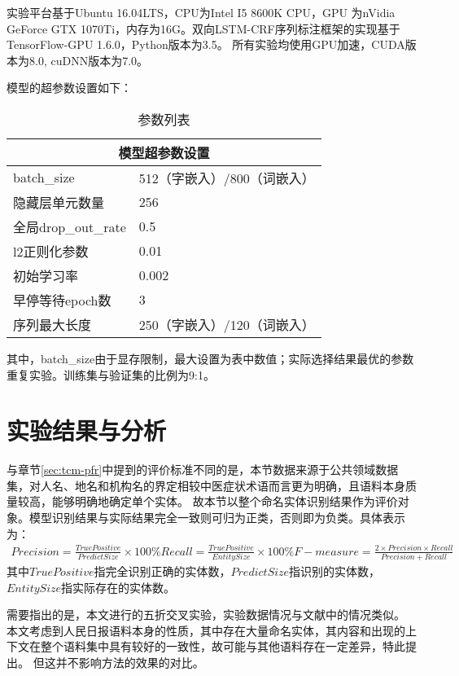 实验平台基于Ubuntu 16.04LTS，CPU为Intel I5 8600K CPU，GPU 为nVidia GeForce GTX 1070Ti，内存为16G。双向LSTM-CRF序列标注框架的实现基于TensorFlow-GPU 1.6.0，Python版本为3.5。
所有实验均使用GPU加速，CUDA版本为8.0, cuDNN版本为7.0。

模型的超参数设置如下：
\begin{table}[H]
    \centering
    \caption{参数列表}
    \begin{tabular}{ll}
        \toprule
        \multicolumn{2}{c}{模型超参数设置} \\
        \midrule
        batch\_size & 512（字嵌入）/800（词嵌入） \\
        隐藏层单元数量 & 256\\
        全局drop\_out\_rate & 0.5 \\
        l2正则化参数 & 0.01 \\
        初始学习率 & 0.002 \\
        早停等待epoch数 & 3\\
        序列最大长度 & 250（字嵌入）/120（词嵌入）\\
        \bottomrule
    \end{tabular}
\end{table}
其中，batch\_size由于显存限制，最大设置为表中数值；实际选择结果最优的参数重复实验。训练集与验证集的比例为9:1。

\section{实验结果与分析}
与章节\ref{sec:tcm-pfr}中提到的评价标准不同的是，本节数据来源于公共领域数据集，对人名、地名和机构名的界定相较中医症状术语而言更为明确，且语料本身质量较高，能够明确地确定单个实体。
故本节以整个命名实体识别结果作为评价对象。模型识别结果与实际结果完全一致则可归为正类，否则即为负类。具体表示为：
\begin{align}
    Precision = \frac{True Positive}{Predict Size} \times 100\%
    Recall = \frac{True Positive}{Entity Size} \times 100\%
    F-measure = \frac{2\times Precision \times Recall}{Precision + Recall}
\end{align}
其中$True Positive$指完全识别正确的实体数，$Predict Size$指识别的实体数，$Entity Size$指实际存在的实体数。

需要指出的是，本文进行的五折交叉实验，实验数据情况与文献中的情况类似。
本文考虑到人民日报语料本身的性质，其中存在大量命名实体，其内容和出现的上下文在整个语料集中具有较好的一致性，故可能与其他语料存在一定差异，特此提出。
但这并不影响方法的效果的对比。

